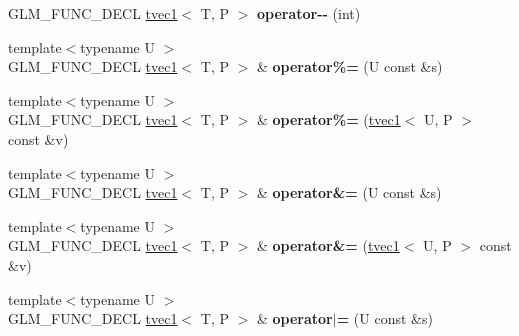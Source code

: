 \begin{DoxyCompactItemize}
\item 
\hypertarget{structglm_1_1tvec1_a0a86fc40aff82fc243630ca2f6c44b6f}{G\-L\-M\-\_\-\-F\-U\-N\-C\-\_\-\-D\-E\-C\-L \hyperlink{structglm_1_1tvec1}{tvec1}$<$ T, P $>$ {\bfseries operator-\/-\/} (int)}\label{structglm_1_1tvec1_a0a86fc40aff82fc243630ca2f6c44b6f}

\item 
\hypertarget{structglm_1_1tvec1_a2bcd9d7e33a00a42810169c33015bdc5}{{\footnotesize template$<$typename U $>$ }\\G\-L\-M\-\_\-\-F\-U\-N\-C\-\_\-\-D\-E\-C\-L \hyperlink{structglm_1_1tvec1}{tvec1}$<$ T, P $>$ \& {\bfseries operator\%=} (U const \&s)}\label{structglm_1_1tvec1_a2bcd9d7e33a00a42810169c33015bdc5}

\item 
\hypertarget{structglm_1_1tvec1_acb4b8e73890ac7f9a0b4700c1c268500}{{\footnotesize template$<$typename U $>$ }\\G\-L\-M\-\_\-\-F\-U\-N\-C\-\_\-\-D\-E\-C\-L \hyperlink{structglm_1_1tvec1}{tvec1}$<$ T, P $>$ \& {\bfseries operator\%=} (\hyperlink{structglm_1_1tvec1}{tvec1}$<$ U, P $>$ const \&v)}\label{structglm_1_1tvec1_acb4b8e73890ac7f9a0b4700c1c268500}

\item 
\hypertarget{structglm_1_1tvec1_a9797dc526cd65772f9e0cbc2f3e69d4c}{{\footnotesize template$<$typename U $>$ }\\G\-L\-M\-\_\-\-F\-U\-N\-C\-\_\-\-D\-E\-C\-L \hyperlink{structglm_1_1tvec1}{tvec1}$<$ T, P $>$ \& {\bfseries operator\&=} (U const \&s)}\label{structglm_1_1tvec1_a9797dc526cd65772f9e0cbc2f3e69d4c}

\item 
\hypertarget{structglm_1_1tvec1_a672c44812f4806e389fd1ec24466b0d8}{{\footnotesize template$<$typename U $>$ }\\G\-L\-M\-\_\-\-F\-U\-N\-C\-\_\-\-D\-E\-C\-L \hyperlink{structglm_1_1tvec1}{tvec1}$<$ T, P $>$ \& {\bfseries operator\&=} (\hyperlink{structglm_1_1tvec1}{tvec1}$<$ U, P $>$ const \&v)}\label{structglm_1_1tvec1_a672c44812f4806e389fd1ec24466b0d8}

\item 
\hypertarget{structglm_1_1tvec1_a646f581788627976aceb40cb7ac3f32f}{{\footnotesize template$<$typename U $>$ }\\G\-L\-M\-\_\-\-F\-U\-N\-C\-\_\-\-D\-E\-C\-L \hyperlink{structglm_1_1tvec1}{tvec1}$<$ T, P $>$ \& {\bfseries operator$\vert$=} (U const \&s)}\label{structglm_1_1tvec1_a646f581788627976aceb40cb7ac3f32f}


\end{DoxyCompactItemize}
